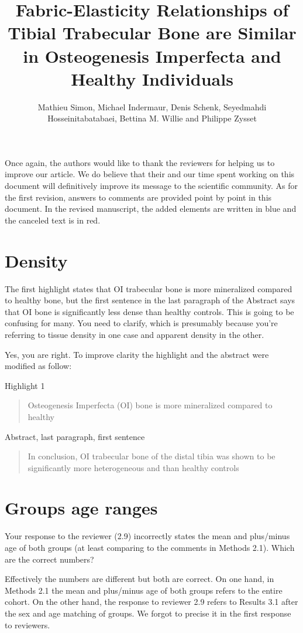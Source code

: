 \documentclass{AR2RC}
\title{Fabric-Elasticity Relationships of Tibial Trabecular Bone are Similar in Osteogenesis Imperfecta and Healthy Individuals}
\author{Mathieu Simon, Michael Indermaur, Denis Schenk, Seyedmahdi Hosseinitabatabaei, Bettina	M. Willie and Philippe Zysset}
\begin{document}
\maketitle

\vspace{1em}Once again, the authors would like to thank the reviewers for helping us to improve our article. We do believe that their and our time spent working on this document will definitively improve its message to the scientific community. As for the first revision, answers to comments are provided point by point in this document. In the revised manuscript, the added elements are written in blue and the canceled text is in red.

\section{Density}
\RC The first highlight states that OI trabecular bone is more mineralized compared to healthy bone, but the first sentence in the last paragraph of the Abstract says that OI bone is significantly less dense than healthy controls. This is going to be confusing for many. You need to clarify, which is presumably because you’re referring to tissue density in one case and apparent density in the other.

\AR Yes, you are right. To improve clarity the highlight and the abstract were modified as follow:

Highlight 1
\begin{quote}
	Osteogenesis Imperfecta (OI)  bone  is more mineralized compared to healthy
\end{quote} 

Abstract, last paragraph, first sentence
\begin{quote}
	In conclusion, OI trabecular bone of the distal tibia was shown to be significantly more heterogeneous and   than healthy controls
\end{quote} 

\section{Groups age ranges}
\RC Your response to the reviewer (2.9) incorrectly states the mean and plus/minus age of both groups (at least comparing to the comments in Methods 2.1). Which are the correct numbers?

\AR Effectively the numbers are different but both are correct. On one hand, in Methods 2.1 the mean and plus/minus age of both groups refers to the entire cohort. On the other hand, the response to reviewer 2.9 refers to Results 3.1 after the sex and age matching of groups. We forgot to precise it in the first response to reviewers.
\end{document}
